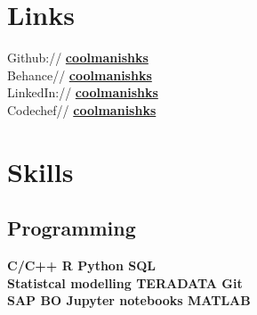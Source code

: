 \documentclass[a4paper]{deedy-resume} %
\begin{document}
\begin{minipage}[t]{0.33\textwidth}
\section{Links} 

Github:// \href{https://github.com/coolmanishks}{\bf coolmanishks} \\
Behance// \href{https://www.behance.net/coolmanishks}{\bf coolmanishks}\\
LinkedIn:// \href{https://www.linkedin.com/in/coolmanishks}{\bf coolmanishks} \\
Codechef// \href{https://www.codechef.com/users/coolmanishks}{\bf coolmanishks}\\

\sectionspace %








\section{Skills}

\subsection{Programming}

\textbf{C/C++ \textbullet{} R \textbullet{} Python  \textbullet{} SQL \\
Statistcal modelling\textbullet{} TERADATA \textbullet Git \\
SAP BO \textbullet{}  Jupyter notebooks \textbullet{} MATLAB } \\


\end{minipage}
\end{document}
